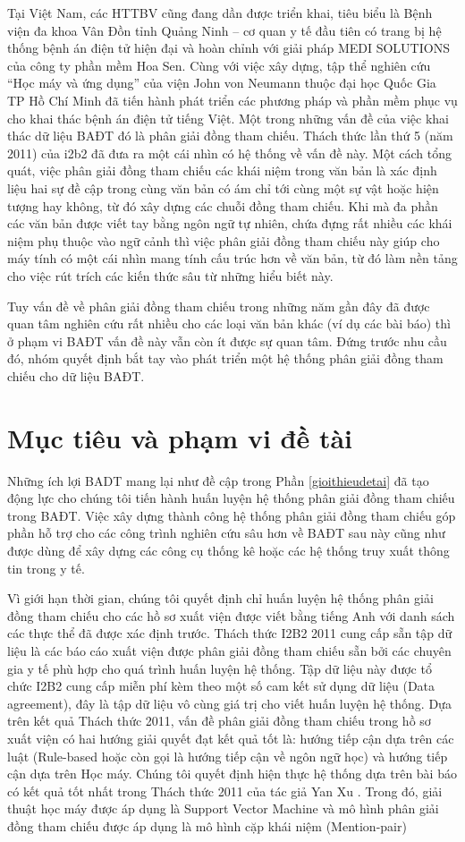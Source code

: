 Tại Việt Nam, các HTTBV cũng đang dần được triển khai, tiêu biểu là Bệnh viện đa khoa Vân Đồn tỉnh Quảng Ninh – cơ quan y tế đầu tiên có trang bị hệ thống bệnh án điện tử hiện đại và hoàn chỉnh với giải pháp MEDI SOLUTIONS của công ty phần mềm Hoa Sen. Cùng với việc xây dựng, tập thể nghiên cứu ``Học máy và ứng dụng'' của viện John von Neumann thuộc đại học Quốc Gia TP Hồ Chí Minh đã tiến hành phát triển các phương pháp và phần mềm phục vụ cho khai thác bệnh án điện tử tiếng Việt. Một trong những vấn đề của việc khai thác dữ liệu BAĐT đó là phân giải đồng tham chiếu. Thách thức lần thứ 5 (năm 2011) của i2b2 đã đưa ra một cái nhìn có hệ thống về vấn đề này. Một cách tổng quát, việc phân giải đồng tham chiếu các khái niệm trong văn bản là xác định liệu hai sự đề cập trong cùng văn bản có ám chỉ tới cùng một sự vật hoặc hiện tượng hay không, từ đó xây dựng các chuỗi đồng tham chiếu. Khi mà đa phần các văn bản được viết tay bằng ngôn ngữ tự nhiên, chứa đựng rất nhiều các khái niệm phụ thuộc vào ngữ cảnh thì việc phân giải đồng tham chiếu này giúp cho máy tính có một cái nhìn mang tính cấu trúc hơn về văn bản, từ đó làm nền tảng cho việc rút trích các kiến thức sâu từ những hiểu biết này.

Tuy vấn đề về phân giải đồng tham chiếu trong những năm gần đây đã được quan tâm nghiên cứu rất nhiều cho các loại văn bản khác (ví dụ các bài báo) thì ở phạm vi BAĐT vấn đề này vẫn còn ít được sự quan tâm. Đứng trước nhu cầu đó, nhóm quyết định bắt tay vào phát triển một hệ thống phân giải đồng tham chiếu cho dữ liệu BAĐT.

\section{Mục tiêu và phạm vi đề tài}
Những ích lợi BADT mang lại như đề cập trong Phần \ref{gioithieudetai} đã tạo động lực cho chúng tôi tiến hành huấn luyện hệ thống phân giải đồng tham chiếu trong BAĐT. Việc xây dựng thành công hệ thống phân giải đồng tham chiếu góp phần hỗ trợ cho các công trình nghiên cứu sâu hơn về BAĐT sau này cũng như được dùng để xây dựng các công cụ thống kê hoặc các hệ thống truy xuất thông tin trong y tế.

Vì giới hạn thời gian, chúng tôi quyết định chỉ huấn luyện hệ thống phân giải đồng tham chiếu cho các hồ sơ xuất viện được viết bằng tiếng Anh với danh sách các thực thể đã được xác định trước. Thách thức I2B2 2011 cung cấp sẵn tập dữ liệu là các báo cáo xuất viện được phân giải đồng tham chiếu sẵn bởi các chuyên gia y tế phù hợp cho quá trình huấn luyện hệ thống. Tập dữ liệu này được tổ chức I2B2 cung cấp miễn phí kèm theo một số cam kết sử dụng dữ liệu (Data agreement), đây là tập dữ liệu vô cùng giá trị cho viết huấn luyện hệ thống. Dựa trên kết quả Thách thức 2011, vấn đề phân giải đồng tham chiếu trong hồ sơ xuất viện có hai hướng giải quyết đạt kết quả tốt là: hướng tiếp cận dựa trên các luật (Rule-based hoặc còn gọi là hướng tiếp cận về ngôn ngữ học) và hướng tiếp cận dựa trên Học máy. Chúng tôi quyết định hiện thực hệ thống dựa trên bài báo có kết quả tốt nhất trong Thách thức 2011 của tác giả Yan Xu \cite{YanXu2012}. Trong đó, giải thuật học máy được áp dụng là Support Vector Machine và mô hình phân giải đồng tham chiếu được áp dụng là mô hình cặp khái niệm (Mention-pair)

